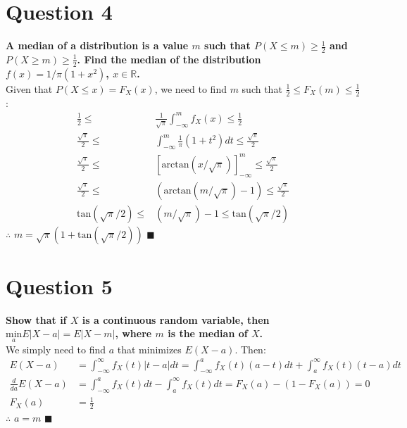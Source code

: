 \documentclass{article}
\newcommand{\R}{\mathbb{R}}
\newcommand{\intinf}{\int_{-\infty}^{\infty}}
\begin{document}
\section*{Question 4}
\textbf{A median of a distribution is a value $m$ such that $P(X\leq m)\geq\frac{1}{2}$ and $P(X\geq m)\geq\frac{1}{2}$. Find the median of the distribution $f(x)=1/\pi(1+x^2)$, $x\in\R$.}
\bigskip \\
Given that $P(X\leq x)=F_X(x)$, we need to find $m$ such that $\frac{1}{2}\leq F_X(m)\leq\frac{1}{2}$:
\begin{align*}
	\frac{1}{2} 			\leq &\frac{1}{\sqrt{\pi}}\int_{-\infty}^m f_X(x) 	\leq \frac{1}{2} 				\\
	\frac{\sqrt{\pi}}{2} 	\leq &\int_{-\infty}^m \frac{1}{\pi}(1+t^2)dt 		\leq \frac{\sqrt{\pi}}{2} 		\\
	\frac{\sqrt{\pi}}{2} 	\leq &[\text{arctan}(x/\sqrt{\pi})]^m_{-\infty}		\leq \frac{\sqrt{\pi}}{2} 		\\
	\frac{\sqrt{\pi}}{2} 	\leq &(\text{arctan}(m/\sqrt{\pi})-1)				\leq \frac{\sqrt{\pi}}{2}		\\
	\text{tan}(\sqrt{\pi}/2)\leq &(m/\sqrt{\pi})-1								\leq \text{tan}(\sqrt{\pi}/2)	
\end{align*}
$\therefore$ $m = \sqrt{\pi}(1 + \text{tan}(\sqrt{\pi}/2))$	$\blacksquare$


\pagebreak
\section*{Question 5}
\textbf{Show that if $X$ is a continuous random variable, then $\underset{a}{\text{min}}E|X-a|=E|X-m|$, where $m$ is the median of $X$.}
\bigskip \\
We simply need to find $a$ that minimizes $E(X-a)$. Then:
\begin{align*}
	E(X-a)				&=  \intinf f_X(t)|t-a|dt = \int_{-\infty}^a f_X(t)(a-t)dt + \int_a^\infty f_X(t)(t-a)dt	\\
	\frac{d}{da}E(X-a)	&= \int_{-\infty}^a f_X(t)dt - \int_a^\infty f_X(t)dt = F_X(a) - (1 - F_X(a)) = 0			\\
	F_X(a)				&= \frac{1}{2}
\end{align*}
$\therefore$ $a=m$	$\blacksquare$


\end{document}
